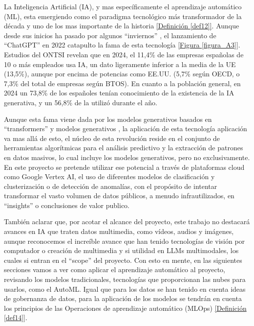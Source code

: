 La Inteligencia Artificial (IA), y mas específicamente el aprendizaje automático (ML), esta emergiendo como el paradigma tecnológico más transformador de la década y uno de los mas importante de la historia \hyperref[def12]{[Definición \ref*{def12}]}. Aunque desde sus inicios ha pasado por algunos ``inviernos'' \citep{Cheok2023AIHistory}, el lanzamiento de ``ChatGPT'' en 2022 catapulto la fama de esta tecnología \hyperref[figura_A3]{[Figura \ref*{figura_A3}]}. Estudios del ONTSI \citep{ontsi2025indicadores} revelan que en 2024, el 11,4\% de las empresas españolas de 10 o más empleados usa IA, un dato ligeramente inferior a la media de la UE (13,5\%), aunque por encima de potencias como EE.UU. (5,7\% según OECD, o 7,3\% del total de empresas según BTOS). En cuanto a la población general, en 2024 un 73,8\% de los españoles tenían conocimiento de la existencia de la IA generativa, y un 56,8\% de la utilizó durante el año.

Aunque esta fama viene dada por los modelos generativos basados en ``transformers'' y modelos generativos  \citep{vaswani2017attention}, la aplicación de esta tecnología aplicación va mas allá de esto, el núcleo de esta revolución reside en  el conjunto de herramientas algorítmicas para el análisis predictivo y la extracción de patrones en datos masivos, lo cual incluye los modelos generativos, pero no exclusivamente. En este proyecto se pretende utilizar ese potencial a través de plataformas cloud como Google Vertex AI, el uso de diferentes modelos de clasificación y clusterización o de detección de anomalías, con el propósito de intentar transformar el vasto volumen de datos públicos, a menudo infrautilizados, en ``insights'' o conclusiones de valor publico.

También aclarar que, por acotar el alcance del proyecto, este trabajo no destacará avances en IA que traten datos multimedia, como vídeos, audios y imágenes, aunque reconocemos el increíble avance que han tenido tecnologías de visión por computador o creación de multimedia y si utilidad en LLMs multimodales, los cuales si entran en el ``scope'' del proyecto. Con esto en mente, en las siguientes secciones vamos a ver como aplicar el aprendizaje automático al proyecto, revisando los modelos tradicionales, tecnologías que proporcionan las nubes para usarlos, como el AutoML. Igual que para los datos se han tenido en cuenta ideas de gobernanza de datos, para la aplicación de los modelos se tendrán en cuenta los principios de las Operaciones de aprendizaje automático (MLOps) \hyperref[def14]{[Definición \ref*{def14}]}.

